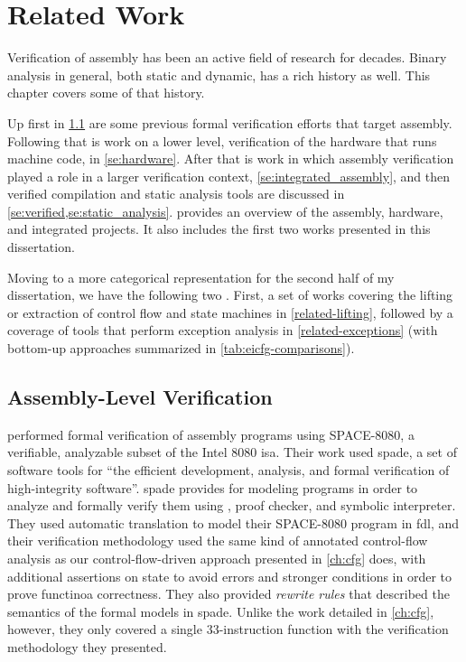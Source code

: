 \chapter{Related Work}\label{ch:related}
Verification of assembly has been an active field of research for decades.
Binary analysis in general, both static and dynamic, has a rich history as well.
This chapter covers some of that history.

Up first in \cref{se:previous_assembly}
are some previous formal verification efforts that target assembly.
Following that is work on a lower level,
verification of the hardware that runs machine code, in \cref{se:hardware}.
After that is work in which assembly verification played a role
in a larger verification context, \cref{se:integrated_assembly},
and then verified compilation and static analysis tools are discussed
in \cref{se:verified,se:static_analysis}.
 provides an overview of the assembly,
hardware, and integrated projects.
It also includes the first two works presented in this dissertation.

Moving to a more categorical representation for the second half of my dissertation, we have the following two .
First, a set of works covering the lifting or extraction of control flow and state machines in \cref{related-lifting}, followed by a coverage of tools that perform exception analysis in \cref{related-exceptions} (with bottom-up approaches summarized in \cref{tab:eicfg-comparisons}).

\section{Assembly-Level Verification}\label{se:previous_assembly}
\Textcite{clutterbuck1988verification} performed formal verification
of assembly programs using SPACE-8080, a verifiable,
analyzable subset of the Intel 8080 \ac{isa}.
Their work used \ac{spade}, a set of software tools for ``the efficient development,
analysis, and formal verification of high-integrity software''.
\Ac{spade} provides  for modeling programs
in order to analyze and formally verify them
using , proof checker, and symbolic interpreter.
They used automatic translation to model their SPACE-8080 program
in \ac{fdl}, and their verification methodology used the same kind of
annotated control-flow analysis as our control-flow-driven approach
presented in \cref{ch:cfg} does, with additional assertions on state to avoid errors
and stronger conditions in order to prove functinoa correctness.
They also provided \emph{rewrite rules} that described the semantics
of the formal models in \ac{spade}. Unlike the work detailed in \cref{ch:cfg}, however,
they only covered a single 33-instruction function
with the verification methodology they presented.

